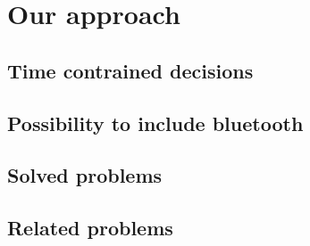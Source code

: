 {\color{PineGreen}\section{Our approach}}


{\color{PineGreen}\subsection{Time contrained decisions}}

{\color{PineGreen}\subsection{Possibility to include bluetooth}}
{\color{PineGreen}\subsection{Solved problems}}

{\color{PineGreen}\subsection{Related problems}}


